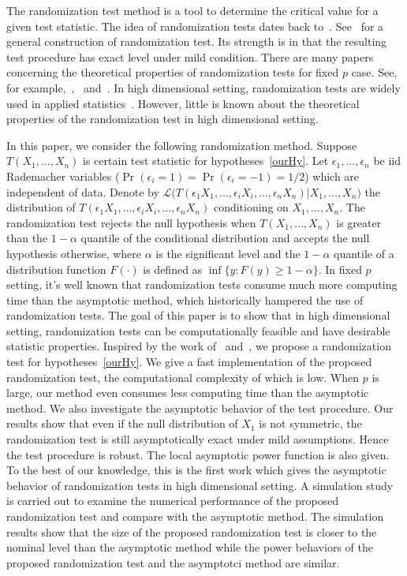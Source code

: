 \documentclass[smallcondensed,final,natbib]{svjour3}          %
\begin{document}
The randomization test method is a tool to determine the critical value for a given test statistic.
The idea of randomization tests dates back to~\citet{Fisher}.
See~\citet{Romano1990On} for a general construction of randomization test.
Its strength is in that the resulting test procedure has exact level under mild condition.
There are many papers concerning the theoretical properties of randomization tests for fixed $p$ case.
See, for example,~\citet{Romano1990On},~\citet{Zhu2000N} and~\citet{Chung2016Multivariate}.
In high dimensional setting, randomization tests are widely used in applied statistics~\citep{Subramanian2005,efron2007on,Ko2016}.
However, little is known about the theoretical properties of the randomization test in high dimensional setting.

In this paper, we consider the following randomization method.
Suppose $T(X_1,\ldots,X_n)$ is certain test statistic for hypotheses~\eqref{ourHy}.
Let $\epsilon_1,\ldots,\epsilon_n$ be iid Rademacher variables ($\Pr(\epsilon_i=1)=\Pr(\epsilon_i=-1)=1/2$) which are independent of data.
Denote by
    $
    \mathcal{L}\big(T(\epsilon_1 X_1,\ldots,\epsilon_i X_i,\ldots,\epsilon_n X_n)|X_1,\ldots,X_n\big)
    $
 the distribution of $T(\epsilon_1 X_1,\ldots,\epsilon_i X_i,\ldots,\epsilon_n X_n)$ conditioning on $X_1,\ldots,X_n$.
 The randomization test rejects the null hypothesis when $T(X_1,\ldots, X_n)$ is greater than the $1-\alpha$ quantile of the conditional distribution and accepts the null hypothesis otherwise, where $\alpha$ is the significant level and the $1-\alpha$ quantile of a distribution function $F(\cdot)$ is defined as $\inf\{y: F(y)\geq 1-\alpha\}$.
In fixed $p$ setting, it's well known that randomization tests consume much more computing time than the asymptotic method, which  historically  hampered the use of randomization tests. 
The goal of this paper is to show that in high dimensional setting, randomization tests can be computationally feasible and have desirable statistic properties.
Inspired by the work of~\citet{Bai1996Efiect} and~\citet{Chen2010A}, we propose a randomization test for hypotheses~\eqref{ourHy}.
We give a fast implementation of the proposed randomization test, the computational complexity of which is low.
When $p$ is large, our method even consumes less computing time  than the asymptotic method.
We also investigate the asymptotic behavior of the test procedure.
Our results show that even if the null distribution of $X_1$ is not symmetric, the randomization test is still asymptotically exact under mild assumptions. 
Hence the test procedure is robust.
The local asymptotic power function is also given.
To the best of our knowledge, this is the first work which gives the asymptotic behavior of randomization tests in high dimensional setting.
A simulation study is carried out to examine the numerical performance of the proposed randomization test and compare with the asymptotic method.
The simulation results show that the size of the proposed randomization test is closer to the nominal level than the asymptotic method while the power behaviors of the proposed randomization test and the asymptotci method are similar.
\end{document}
